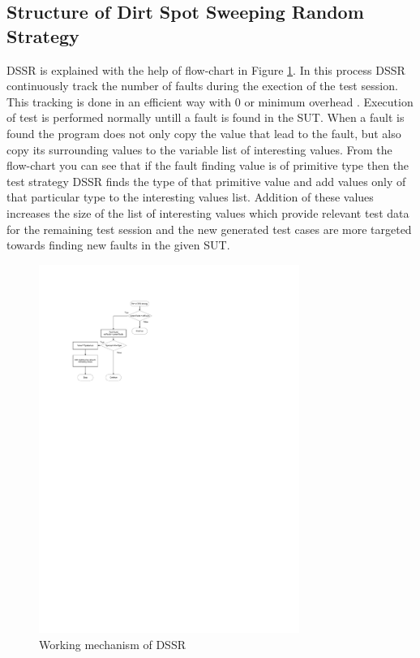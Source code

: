\documentclass[10pt, conference, compsocconf]{IEEEtran}
\begin{document}
\subsection{Structure of Dirt Spot Sweeping Random Strategy}

DSSR is explained with the help of flow-chart in Figure \ref{fig:Working_DSSS}. In this process DSSR continuously track the number of faults during the exection of the test session. This tracking is done in an efficient way with 0 or minimum overhead \cite{Leitner2009}. Execution of test is performed normally untill a fault is found in the SUT. When a fault is found the program does not only copy the value that lead to the fault, but also copy its surrounding values to the variable list of interesting values. From the flow-chart you can see that if the fault finding value is of primitive type then the test strategy DSSR finds the type of that primitive value and add values only of that particular type to the interesting values list. Addition of these values increases the size of the list of interesting values which provide relevant test data for the remaining test session and the new generated test cases are more targeted towards finding new faults in the given SUT.\\

\begin{figure}[htp]
\centering
\includegraphics[width=8.5cm,height=12cm]{flowchart1.pdf}
\caption{Working mechanism of DSSR}
\label{fig:Working_DSSS}
\end{figure}
\end{document}
